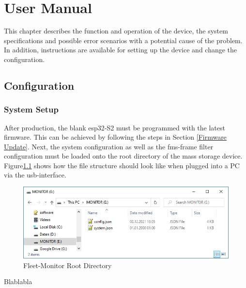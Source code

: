 \chapter{User Manual}
This chapter describes the function and operation of the device, the system specifications and possible error scenarios with a potential cause of the problem. In addition, instructions are available for setting up the device and change the configuration.

\section{Configuration}
\subsection{System Setup}
After production, the blank \gls{esp32}-S2 must be programmed with the latest firmware. This can be achieved by following the steps in Section \ref{Firmware Update}. Next, the system configuration as well as the \acrshort{fms}-frame filter configuration must be loaded onto the root directory of the mass storage device. Figure\;\ref{fig:fleet-monitor-root-directory} shows how the file structure should look like when plugged into a PC via the \acrshort{usb}-interface.

\medskip
\begin{figure}[h!]
	\centering
	\includegraphics[width=13cm]{images/File_Explorer}
	\caption{Fleet-Monitor Root Directory}
	\label{fig:fleet-monitor-root-directory}
\end{figure}

Blablabla


\newpage

